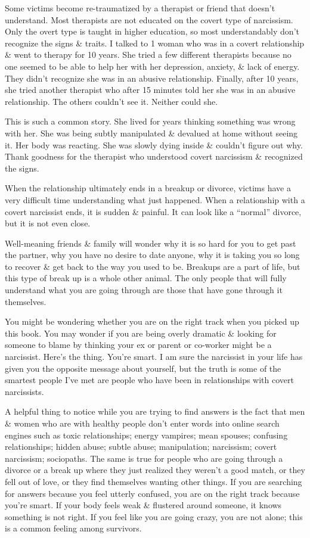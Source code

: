 \documentclass{article}
\numberwithin{equation}{section}
\begin{document}
Some victims become re-traumatized by a therapist or friend that doesn't understand. Most therapists are not educated on the covert type of narcissism. Only the overt type is taught in higher education, so most understandably don't recognize the signs \& traits. I talked to 1 woman who was in a covert relationship \& went to therapy for 10 years. She tried a few different therapists because no one seemed to be able to help her with her depression, anxiety, \& lack of energy. They didn't recognize she was in an abusive relationship. Finally, after 10 years, she tried another therapist who after 15 minutes told her she was in an abusive relationship. The others couldn't see it. Neither could she.

This is such a common story. She lived for years thinking something was wrong with her. She was being subtly manipulated \& devalued at home without seeing it. Her body was reacting. She was slowly dying inside \& couldn't figure out why. Thank goodness for the therapist who understood covert narcissism \& recognized the signs.

When the relationship ultimately ends in a breakup or divorce, victims have a very difficult time understanding what just happened. When a relationship with a covert narcissist ends, it is sudden \& painful. It can look like a ``normal'' divorce, but it is not even close.

Well-meaning friends \& family will wonder why it is so hard for you to get past the partner, why you have no desire to date anyone, why it is taking you so long to recover \& get back to the way you used to be. Breakups are a part of life, but this type of break up is a whole other animal. The only people that will fully understand what you are going through are those that have gone through it themselves.

You might be wondering whether you are on the right track when you picked up this book. You may wonder if you are being overly dramatic \& looking for someone to blame by thinking your ex or parent or co-worker might be a narcissist. Here's the thing. You're smart. I am sure the narcissist in your life has given you the opposite message about yourself, but the truth is some of the smartest people I've met are people who have been in relationships with covert narcissists.

A helpful thing to notice while you are trying to find answers is the fact that men \& women who are with healthy people don't enter words into online search engines such as toxic relationships; energy vampires; mean spouses; confusing relationships; hidden abuse; subtle abuse; manipulation; narcissism; covert narcissism; sociopaths. The same is true for people who are going through a divorce or a break up where they just realized they weren't a good match, or they fell out of love, or they find themselves wanting other things. If you are searching for answers because you feel utterly confused, you are on the right track because you're smart. If your body feels weak \& flustered around someone, it knows something is not right. If you feel like you are going crazy, you are not alone; this is a common feeling among survivors.
\end{document}
